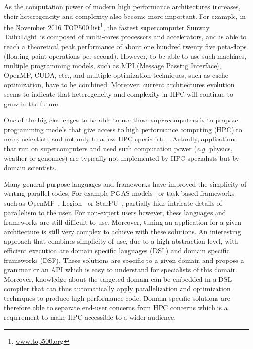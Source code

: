 As the computation power of modern high performance architectures increases, their heterogeneity and complexity also become more important. For example, in the November 2016 TOP500 list\footnote{\url{www.top500.org}}, the fastest supercomputer Sunway TaihuLight~is composed of multi-cores processors and accelerators, and is able to reach a theoretical peak performance of about one hundred twenty five peta-flops (floating-point operations per second). However, to be able to use such machines, multiple programming models, such as MPI (Message Passing Interface), OpenMP, CUDA, etc., and multiple optimization techniques, such as cache optimization, have to be combined. Moreover, current architectures evolution seems to indicate that heterogeneity and complexity in HPC will continue to grow in the future.

One of the big challenges to be able to use those supercomputers is to propose programming models that give access to high performance computing (HPC) to many scientists and not only to a few HPC specialists~\cite{ETP4HPC2013}. Actually, applications that run on supercomputers and need such computation power (\textit{e.g.} physics, weather or genomics) are typically not implemented by HPC specialists but by domain scientists.

Many general purpose languages and frameworks have improved the simplicity of writing parallel codes. For example PGAS models~\cite{Nieplocha:2006:AAP:1125980.1125985} or task-based frameworks, such as OpenMP~\cite{660313}, Legion~\cite{bauer:legion:sc:2012} or StarPU~\cite{Augonnet2011}, partially hide intricate details of parallelism to the user. For non-expert users however, these languages and frameworks are still difficult to use. Moreover, tuning an application for a given architecture is still very complex to achieve with these solutions.
An interesting approach that combines simplicity of use, due to a high abstraction level, with efficient execution are domain specific languages (DSL) and domain specific frameworks (DSF).
These solutions are specific to a given domain and propose a grammar or an API which is easy to understand for specialists of this domain.
Moreover, knowledge about the targeted domain can be embedded in a DSL compiler that can thus automatically apply parallelization and optimization techniques to produce high performance code.
Domain specific solutions are therefore able to separate end-user concerns from HPC concerns which is a requirement to make HPC accessible to a wider audience.

